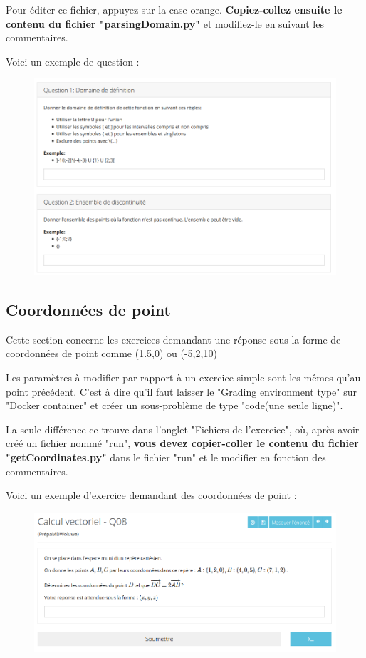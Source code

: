 \documentclass{article}
\begin{document}
Pour éditer ce fichier, appuyez sur la case orange. \textbf{Copiez-collez ensuite le contenu du fichier "parsingDomain.py"} et modifiez-le en suivant les commentaires.

Voici un exemple de question :

\begin{figure}[!htb]
    \centering
    \includegraphics[scale=0.65]{images/dom.png}
\end{figure}

\newpage
\subsection{Coordonnées de point} \label{coord}

Cette section concerne les exercices demandant une réponse sous la forme de coordonnées de point comme (1.5,0) ou  (-5,2,10)
\bigskip

Les paramètres à modifier par rapport à un exercice simple sont les mêmes qu'au point précédent. C'est à dire qu'il faut laisser le "Grading environment type" sur "Docker container" et créer un sous-problème de type "code(une seule ligne)". 

La seule différence ce trouve dans l'onglet "Fichiers de l'exercice", où, après avoir créé un fichier nommé "run", \textbf{vous devez copier-coller le contenu du fichier "getCoordinates.py"} dans le fichier "run" et le modifier en fonction des commentaires.
\bigskip

Voici un exemple d'exercice demandant des coordonnées de point :

\begin{figure}[!htb]
    \centering
    \includegraphics[scale=0.65]{images/coord.png}
\end{figure}
\end{document}
